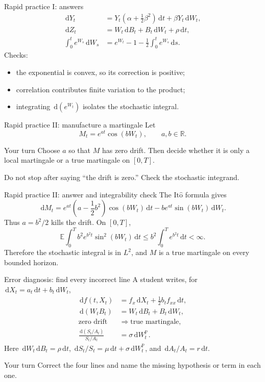 \documentclass[handout,10pt,aspectratio=169]{beamer}
\newcommand{\E}{\mathbb E}
\newcommand{\Pp}{\mathbb P}
\newcommand{\R}{\mathbb R}
\newcommand{\dd}{\,\mathrm d}
\newcommand{\Ito}{\mathrm{It\hat{o}}}
\begin{document}
\begin{frame}{Rapid practice I: answers}
\begin{align*}
\dd Y_t
&=Y_t\left(\alpha+\frac12\beta^2\right)\dd t
+\beta Y_t\dd W_t,\\
\dd Z_t
&=W_t\dd B_t+B_t\dd W_t+\rho\dd t,\\
\int_0^t e^{W_s}\dd W_s
&=e^{W_t}-1-\frac12\int_0^t e^{W_s}\dd s.
\end{align*}
Checks:
\begin{itemize}
\item the exponential is convex, so its correction is positive;
\item correlation contributes finite variation to the product;
\item integrating \(\dd(e^{W_t})\) isolates the stochastic integral.
\end{itemize}
\end{frame}

\begin{frame}{Rapid practice II: manufacture a martingale}
Let
\[
M_t=e^{at}\cos(bW_t),
\qquad a,b\in\R.
\]
\begin{block}{Your turn}
Choose \(a\) so that \(M\) has zero drift. Then decide whether it is only a local martingale or a true martingale on \([0,T]\).
\end{block}
\vspace{0.3em}
Do not stop after saying ``the drift is zero.'' Check the stochastic integrand.
\end{frame}

\begin{frame}{Rapid practice II: answer and integrability check}
The \(\Ito\) formula gives
\[
\dd M_t
=e^{at}\left(a-\frac12b^2\right)\cos(bW_t)\dd t
-be^{at}\sin(bW_t)\dd W_t.
\]
Thus \(a=b^2/2\) kills the drift. On \([0,T]\),
\[
\E\int_0^T b^2e^{b^2t}\sin^2(bW_t)\dd t
\le b^2\int_0^T e^{b^2t}\dd t<\infty.
\]
Therefore the stochastic integral is in \(L^2\), and \(M\) is a true martingale on every bounded horizon.
\end{frame}

\begin{frame}{Error diagnosis: find every incorrect line}
A student writes, for \(\dd X_t=a_t\dd t+b_t\dd W_t\),
\[
\begin{aligned}
\dd f(t,X_t)
&=f_x\dd X_t+\frac12b_tf_{xx}\dd t,\\
\dd(W_tB_t)&=W_t\dd B_t+B_t\dd W_t,\\
\text{zero drift}&\Longrightarrow\text{true martingale},\\
\frac{\dd(S_t/A_t)}{S_t/A_t}
&=\sigma\dd W_t^{\Pp}.
\end{aligned}
\]
Here \(\dd W_t\dd B_t=\rho\dd t\), \(\dd S_t/S_t=\mu\dd t+\sigma\dd W_t^{\Pp}\), and \(\dd A_t/A_t=r\dd t\).
\begin{block}{Your turn}
Correct the four lines and name the missing hypothesis or term in each one.
\end{block}
\end{frame}
\end{document}
